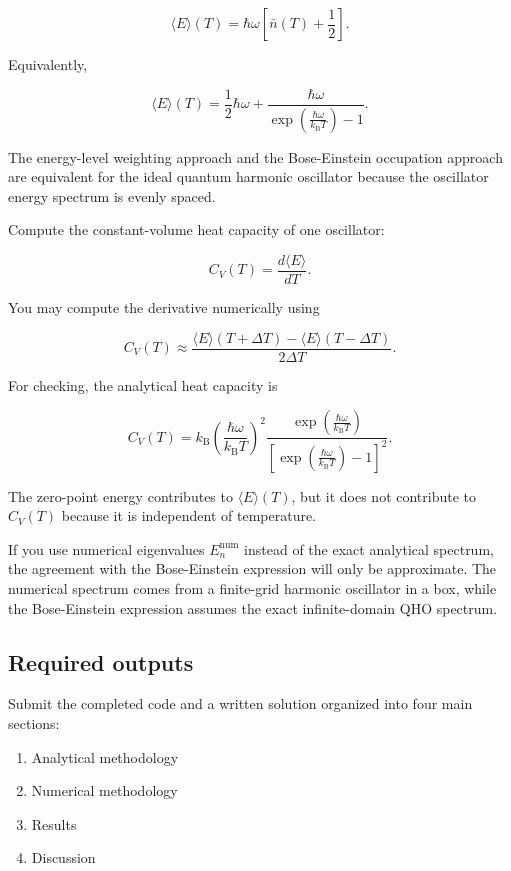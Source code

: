 \[
\langle E\rangle(T)
=
\hbar\omega
\left[
\bar{n}(T)
+
\frac{1}{2}
\right].
\]

Equivalently,

\[
\langle E\rangle(T)
=
\frac{1}{2}\hbar\omega
+
\frac{\hbar\omega}{
\exp\left(\frac{\hbar\omega}{k_{\mathrm B}T}\right)-1
}.
\]

The energy-level weighting approach and the Bose-Einstein occupation approach are equivalent for the ideal quantum harmonic oscillator because the oscillator energy spectrum is evenly spaced.

Compute the constant-volume heat capacity of one oscillator:

\[
C_V(T)
=
\frac{d\langle E\rangle}{dT}.
\]

You may compute the derivative numerically using

\[
C_V(T)
\approx
\frac{
\langle E\rangle(T+\Delta T)
-
\langle E\rangle(T-\Delta T)
}{
2\Delta T
}.
\]

For checking, the analytical heat capacity is

\[
C_V(T)
=
k_{\mathrm B}
\left(
\frac{\hbar\omega}{k_{\mathrm B}T}
\right)^2
\frac{
\exp\left(\frac{\hbar\omega}{k_{\mathrm B}T}\right)
}{
\left[
\exp\left(\frac{\hbar\omega}{k_{\mathrm B}T}\right)-1
\right]^2
}.
\]

The zero-point energy contributes to \(\langle E\rangle(T)\), but it does not contribute to \(C_V(T)\) because it is independent of temperature.

If you use numerical eigenvalues \(E_n^{\mathrm{num}}\) instead of the exact analytical spectrum, the agreement with the Bose-Einstein expression will only be approximate. The numerical spectrum comes from a finite-grid harmonic oscillator in a box, while the Bose-Einstein expression assumes the exact infinite-domain QHO spectrum.

\subsection{Required outputs}

Submit the completed code and a written solution organized into four main sections:

\begin{enumerate}
    \item Analytical methodology
    \item Numerical methodology
    \item Results
    \item Discussion
\end{enumerate}

